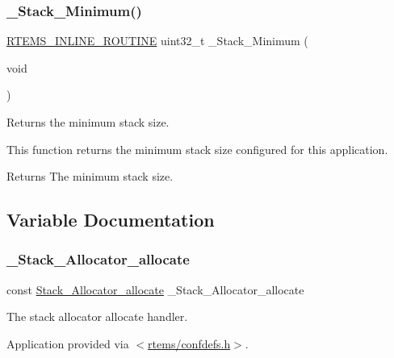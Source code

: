 \subsubsection{\texorpdfstring{\_Stack\_Minimum()}{\_Stack\_Minimum()}}
{\footnotesize\ttfamily \mbox{\hyperlink{group__RTEMSScoreBaseDefs_gac216239df231d5dbd15e3520b0b9313f}{R\+T\+E\+M\+S\+\_\+\+I\+N\+L\+I\+N\+E\+\_\+\+R\+O\+U\+T\+I\+NE}} uint32\+\_\+t \+\_\+\+Stack\+\_\+\+Minimum (\begin{DoxyParamCaption}\item[{void}]{ }\end{DoxyParamCaption})}



Returns the minimum stack size. 

This function returns the minimum stack size configured for this application.

\begin{DoxyReturn}{Returns}
The minimum stack size. 
\end{DoxyReturn}


\subsection{Variable Documentation}
\mbox{\label{group__RTEMSScoreStack_ga990e004f5df8e25208220ffb1efcf7f6}} 
\subsubsection{\texorpdfstring{\_Stack\_Allocator\_allocate}{\_Stack\_Allocator\_allocate}}
{\footnotesize\ttfamily const \mbox{\hyperlink{group__RTEMSScoreStack_ga1e4edf42aa30aeab80fefb866e892a3d}{Stack\+\_\+\+Allocator\+\_\+allocate}} \+\_\+\+Stack\+\_\+\+Allocator\+\_\+allocate}



The stack allocator allocate handler. 

Application provided via $<$\mbox{\hyperlink{confdefs_8h}{rtems/confdefs.\+h}}$>$. \mbox{\label{group__RTEMSScoreStack_ga3ad1e88117c7fed8908bfe98c6da30c3}} 
